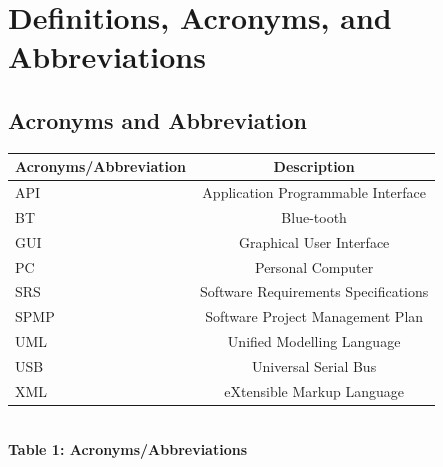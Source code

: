 \documentclass[11pt, a4paper]{report}
\begin{document}
\pagebreak

\chapter{Definitions, Acronyms, and Abbreviations} %
\label{cha:DAA}
\section{Acronyms and Abbreviation}
\begin{center}
\begin{tabular}{|l|c|}
  \hline
  \textbf{Acronyms/Abbreviation} & \textbf{Description}\\
  \hline
  API		& Application Programmable Interface \\
  \hline
  BT		& Blue-tooth \\
  \hline
  GUI		& Graphical User Interface \\
  \hline
  PC		& Personal Computer\\
  \hline
  SRS	& Software Requirements Specifications \\
  \hline
  SPMP 	& Software Project Management Plan \\
  \hline
  UML	& Unified Modelling Language\\
  \hline
  USB	& Universal Serial Bus\\
  \hline
  XML 	& eXtensible Markup Language \\
  \hline
\end{tabular} \\[0.3cm]

\textbf {Table 1: Acronyms/Abbreviations} \\[0.3cm]
\end{center}
\end{document}

